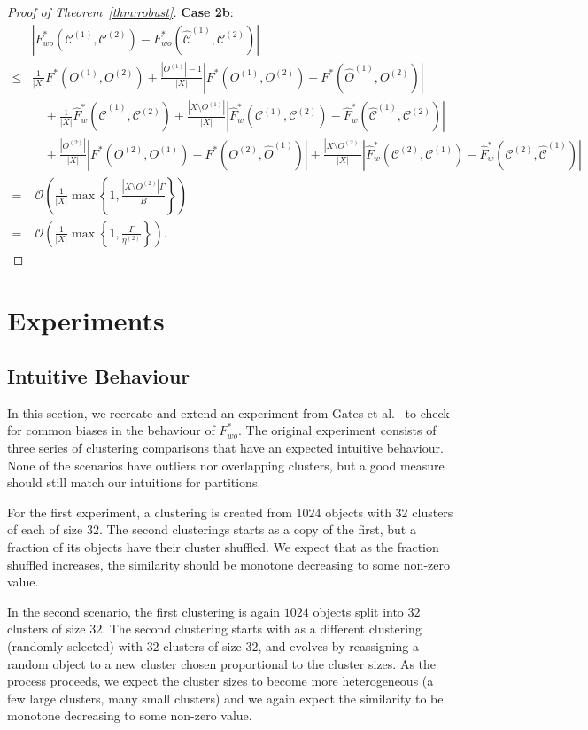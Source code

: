 \documentclass[review,los,12pt]{ryethesis}
\newcommand\cCone{\mathcal{C}^{(1)}}
\newcommand\hcCone{\hat{\mathcal{C}}^{(1)}}
\newcommand\cCtwo{\mathcal{C}^{(2)}}
\newcommand{\bigO}{\mathcal{O}}
\begin{document}
\begin{proof}[Proof of Theorem~\ref{thm:robust}]
    \textbf{Case 2b}:
    \begin{align*}
        & \left| F^*_{wo}(\cCone, \cCtwo) - F^*_{wo}(\hcCone, \cCtwo) \right| \\
        \leq & \frac{1}{|X|}F^*(O^{(1)}, O^{(2)}) + \frac{|O^{(1)}|-1}{|X|}\left|F^*(O^{(1)}, O^{(2)}) - F^*(\hat{O}^{(1)}, O^{(2)})\right| \\
        & \quad + \frac{1}{|X|}\hat{F}^*_w(\hcCone, \cCtwo) + \frac{|X \setminus O^{(1)}|}{|X|} \left|\hat{F}^*_w(\cCone, \cCtwo) - \hat{F}^*_w(\hcCone, \cCtwo)\right| \\
        & \quad + \frac{|O^{(2)}|}{|X|}\left|F^*(O^{(2)}, O^{(1)}) - F^*(O^{(2)}, \hat{O}^{(1)}) \right| + \frac{|X \setminus O^{(2)}|}{|X|}\left| \hat{F}^*_w(\cCtwo, \cCone) - \hat{F}^*_w(\cCtwo, \hcCone)\right| \\
        = & \; \bigO \left( \frac{1}{|X|} \max \left\{ 1, \frac{|X \setminus O^{(2)}| \Gamma}{B} \right\} \right) \\
        = & \; \bigO \left( \frac{1}{|X|} \max \left\{ 1, \frac{\Gamma}{\eta^{(2)}} \right\} \right).
    \end{align*}
\end{proof}


\section{Experiments}
\subsection{Intuitive Behaviour}
In this section, we recreate and extend an experiment from Gates et al.~\cite{ecc} to check for common biases in the behaviour of $F^*_{wo}$.
The original experiment consists of three series of clustering comparisons that have an expected intuitive behaviour.
None of the scenarios have outliers nor overlapping clusters, but a good measure should still match our intuitions for partitions.

For the first experiment, a clustering is created from $1024$ objects with 32 clusters of each of size $32$.
The second clusterings starts as a copy of the first, but a fraction of its objects have their cluster shuffled.
We expect that as the fraction shuffled increases, the similarity should be monotone decreasing to some non-zero value.

In the second scenario, the first clustering is again $1024$ objects split into $32$ clusters of size $32$.
The second clustering starts with as a different clustering (randomly selected) with $32$ clusters of size $32$, and evolves by reassigning a random object to a new cluster chosen proportional to the cluster sizes.
As the process proceeds, we expect the cluster sizes to become more heterogeneous (a few large clusters, many small clusters) and we again expect the similarity to be monotone decreasing to some non-zero value.
\end{document}
